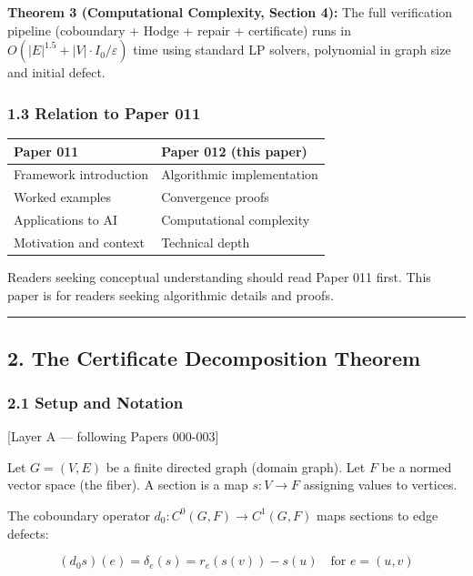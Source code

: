 \documentclass[
]{article}
\begin{document}
\textbf{Theorem 3 (Computational Complexity, Section 4):} The full
verification pipeline (coboundary + Hodge + repair + certificate) runs
in \(O(|E|^{1.5} + |V| \cdot I_0 / \varepsilon)\) time using standard LP
solvers, polynomial in graph size and initial defect.

\subsubsection{1.3 Relation to Paper 011}\label{relation-to-paper-011}

\begin{longtable}[]{@{}ll@{}}
\toprule\noalign{}
Paper 011 & Paper 012 (this paper) \\
\midrule\noalign{}
\endhead
\bottomrule\noalign{}
\endlastfoot
Framework introduction & Algorithmic implementation \\
Worked examples & Convergence proofs \\
Applications to AI & Computational complexity \\
Motivation and context & Technical depth \\
\end{longtable}

Readers seeking conceptual understanding should read Paper 011 first.
This paper is for readers seeking algorithmic details and proofs.

\begin{center}\rule{0.5\linewidth}{0.5pt}\end{center}

\subsection{2. The Certificate Decomposition
Theorem}\label{the-certificate-decomposition-theorem}

\subsubsection{2.1 Setup and Notation}\label{setup-and-notation}

{[}Layer A --- following Papers 000-003{]}

Let \(G = (V, E)\) be a finite directed graph (domain graph). Let \(F\)
be a normed vector space (the fiber). A section is a map \(s: V \to F\)
assigning values to vertices.

The coboundary operator \(d_0: C^0(G, F) \to C^1(G, F)\) maps sections
to edge defects:

\[(d_0 s)(e) = \delta_e(s) = r_e(s(v)) - s(u) \quad \text{for } e = (u, v)\]
\end{document}

